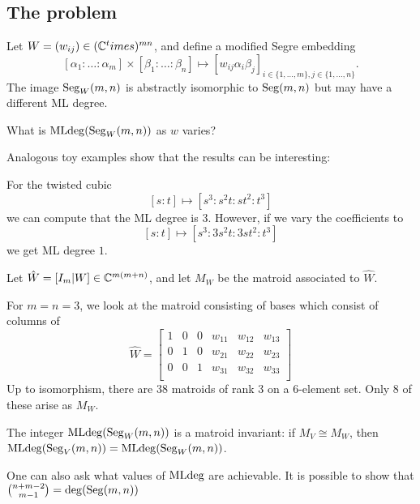 \documentclass{amsart}
\begin{document}
\subsection{The problem}

Let $W = (w_{ij}) \in (\mathbb{C}^times)^{mn}$, and define a modified Segre embedding
\[
	[\alpha_1 : \dots : \alpha_m] \times [\beta_1 : \dots : \beta_n] \mapsto [w_{ij} \alpha_i \beta_j]_{i \in \{1, \dots, m\}, j \in \{1, \dots, n\}}.
\]
The image $\operatorname{Seg}_W(m,n)$ is abstractly isomorphic to $\operatorname{Seg}(m,n)$ but may have a different ML degree.

\begin{qn}
	What is $\operatorname{MLdeg}(\operatorname{Seg}_W(m,n))$ as $w$ varies?
\end{qn}

Analogous toy examples show that the results can be interesting:

\begin{ex}
	For the twisted cubic
	\[
		[s : t] \mapsto [s^3 : s^2 t : st^2 : t^3]
	\]
	we can compute that the ML degree is $3$.
	However, if we vary the coefficients to
	\[
		[s : t] \mapsto [s^3 : 3s^2 t : 3st^2 : t^3]
	\]
	we get ML degree $1$.
\end{ex}

\begin{dfn}
	Let $\hat{W} = [I_m | W] \in \mathbb{C}^{m (m + n)}$, and let $M_W$ be the matroid associated to $\hat{W}$.
\end{dfn}

\begin{ex}
	For $m = n = 3$, we look at the matroid consisting of bases which consist of columns of
	\[
		\hat{W} = \begin{bmatrix}
			1 & 0 & 0 & w_{11} & w_{12} & w_{13} \\
			0 & 1 & 0 & w_{21} & w_{22} & w_{23} \\
			0 & 0 & 1 & w_{31} & w_{32} & w_{33} \\
		\end{bmatrix}
	\]
	Up to isomorphism, there are 38 matroids of rank 3 on a $6$-element set.
	Only 8 of these arise as $M_W$.
\end{ex}

\begin{thm}
	The integer $\operatorname{MLdeg}(\operatorname{Seg}_W(m,n))$ is a matroid invariant: if $M_V \cong M_W$, then $\operatorname{MLdeg}(\operatorname{Seg}_V(m,n)) = \operatorname{MLdeg}(\operatorname{Seg}_W(m,n))$.
\end{thm}

One can also ask what values of $\operatorname{MLdeg}$ are achievable.
It is possible to show that $\binom{n+m-2}{m-1} = \deg(\operatorname{Seg}(m,n))$
\end{document}
